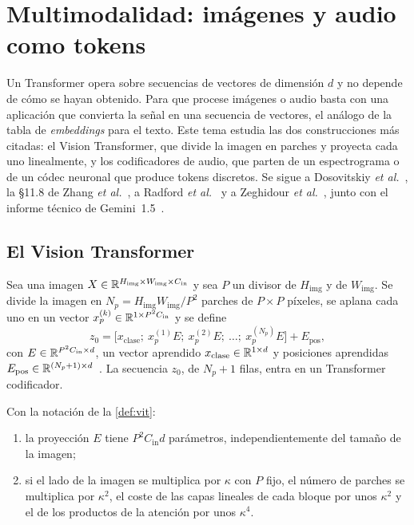 \chapter{Multimodalidad: imágenes y audio como tokens}
\label{tema:6}

Un Transformer opera sobre secuencias de vectores de dimensión $d$ y no depende de cómo se hayan obtenido. Para que procese imágenes o audio basta con una aplicación que convierta la señal en una secuencia de vectores, el análogo de la tabla de \emph{embeddings} para el texto. Este tema estudia las dos construcciones más citadas: el Vision Transformer, que divide la imagen en parches y proyecta cada uno linealmente, y los codificadores de audio, que parten de un espectrograma o de un códec neuronal que produce tokens discretos. Se sigue a Dosovitskiy \emph{et al.}~\cite[§3.1]{vit}, la §11.8 de Zhang \emph{et al.}~\cite{d2l}, a Radford \emph{et al.}~\cite[§2.1 y §2.2]{whisper} y a Zeghidour \emph{et al.}~\cite{soundstream}, junto con el informe técnico de Gemini~1.5~\cite[§3.1]{gemini15}.

\section{El Vision Transformer}

\begin{definicion}\label{def:vit}
Sea una imagen $X\in\mathbb{R}^{H_{\mathrm{img}}\times W_{\mathrm{img}}\times C_{\mathrm{in}}}$ y sea $P$ un divisor de $H_{\mathrm{img}}$ y de $W_{\mathrm{img}}$. Se divide la imagen en $N_p=H_{\mathrm{img}}W_{\mathrm{img}}/P^{2}$ parches de $P\times P$ píxeles, se aplana cada uno en un vector $x_p^{(k)}\in\mathbb{R}^{1\times P^{2}C_{\mathrm{in}}}$ y se define
\[
z_0=\bigl[x_{\mathrm{clase}};\ x_p^{(1)}E;\ x_p^{(2)}E;\ \dots;\ x_p^{(N_p)}E\bigr]+E_{\mathrm{pos}},
\]
con $E\in\mathbb{R}^{P^{2}C_{\mathrm{in}}\times d}$, un vector aprendido $x_{\mathrm{clase}}\in\mathbb{R}^{1\times d}$ y posiciones aprendidas $E_{\mathrm{pos}}\in\mathbb{R}^{(N_p+1)\times d}$~\cite[§3.1, ec.~1]{vit}. La secuencia $z_0$, de $N_p+1$ filas, entra en un Transformer codificador.
\end{definicion}

\begin{proposicion}\label{prop:vit}
Con la notación de la \cref{def:vit}:
\begin{enumerate}
  \item la proyección $E$ tiene $P^{2}C_{\mathrm{in}}d$ parámetros, independientemente del tamaño de la imagen;
  \item si el lado de la imagen se multiplica por $\kappa$ con $P$ fijo, el número de parches se multiplica por $\kappa^{2}$, el coste de las capas lineales de cada bloque por unos $\kappa^{2}$ y el de los productos de la atención por unos $\kappa^{4}$.
\end{enumerate}
\end{proposicion}


